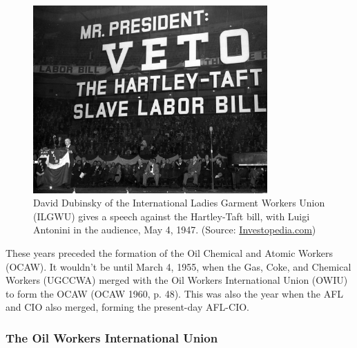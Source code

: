 \documentclass[12pt]{article}
\newcommand{\imageWidth}{0.8\textwidth}
\begin{document}
\begin{figure}
  \centering
  \includegraphics[width=\imageWidth]{images/slave_labor_bill}
  \captionsetup{justification=centering, singlelinecheck=false, margin=2cm} 
  \caption[Anti-Hartley-Taft Rally]{David Dubinsky of the International Ladies Garment Workers Union (ILGWU) gives a speech against the Hartley-Taft bill, with Luigi Antonini in the audience, May 4, 1947. (Source: \href{https://www.investopedia.com/thmb/VcswppMRTl8IqMbgLRqdigfIGvs=/1500x0/filters:no_upscale():max_bytes(150000):strip_icc()/5278798677_0429e6aa05_k-7b6b81bdbbe44cdb929c08c7da9f8d29.jpg}{Investopedia.com})}
  \label{fig:slave_labor_bill}
\end{figure}

These years preceded the formation of the Oil Chemical and Atomic Workers (OCAW). It wouldn’t be until March 4, 1955, when the Gas, Coke, and Chemical Workers (UGCCWA) merged with the Oil Workers International Union (OWIU) to form the OCAW (OCAW 1960, p. 48). This was also the year when the AFL and CIO also merged, forming the present-day AFL-CIO.

\subsubsection{The Oil Workers International Union}
\end{document}

